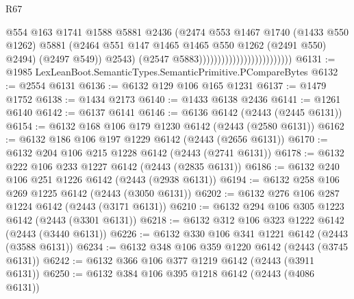 \begin{lexlean}{R67}
\begin{coremodule}
                                                      @554
                                                      @163
                                                      @1741
                                                      @1588
                                                      @5881
                                                      @2436
                                                      (@2474
                                                        @553
                                                        @1467
                                                        @1740
                                                        (@1433 @550 @1262)
                                                        @5881
                                                        (@2464
                                                          @551
                                                          @147
                                                          @1465
                                                          @1465
                                                          @550
                                                          @1262
                                                          (@2491 @550)
                                                          @2494)
                                                        (@2497 @549))
                                                      @2543)
                                                    (@2547 @5883)))))))))))))))))))))))))
@6131 := @1985 LexLeanBoot.SemanticTypes.SemanticPrimitive.PCompareBytes
@6132 := @2554 @6131
@6136 := @6132 @129 @106 @165 @1231
@6137 := @1479 @1752
@6138 := @1434 @2173
@6140 := @1433 @6138 @2436
@6141 := @1261 @6140
@6142 := @6137 @6141
@6146 := @6136 @6142 (@2443 (@2445 @6131))
@6154 := @6132 @168 @106 @179 @1230 @6142 (@2443 (@2580 @6131))
@6162 := @6132 @186 @106 @197 @1229 @6142 (@2443 (@2656 @6131))
@6170 := @6132 @204 @106 @215 @1228 @6142 (@2443 (@2741 @6131))
@6178 := @6132 @222 @106 @233 @1227 @6142 (@2443 (@2835 @6131))
@6186 := @6132 @240 @106 @251 @1226 @6142 (@2443 (@2938 @6131))
@6194 := @6132 @258 @106 @269 @1225 @6142 (@2443 (@3050 @6131))
@6202 := @6132 @276 @106 @287 @1224 @6142 (@2443 (@3171 @6131))
@6210 := @6132 @294 @106 @305 @1223 @6142 (@2443 (@3301 @6131))
@6218 := @6132 @312 @106 @323 @1222 @6142 (@2443 (@3440 @6131))
@6226 := @6132 @330 @106 @341 @1221 @6142 (@2443 (@3588 @6131))
@6234 := @6132 @348 @106 @359 @1220 @6142 (@2443 (@3745 @6131))
@6242 := @6132 @366 @106 @377 @1219 @6142 (@2443 (@3911 @6131))
@6250 := @6132 @384 @106 @395 @1218 @6142 (@2443 (@4086 @6131))

\end{coremodule}
\end{lexlean}
